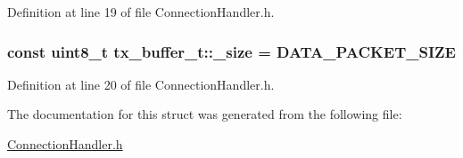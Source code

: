 \-Definition at line 19 of file \-Connection\-Handler.\-h.

\hypertarget{structtx__buffer__t_a9e50e47b9d21ef81014e8325acc2bb3f}{
\subsubsection[{\-\_\-size}]{\setlength{\rightskip}{0pt plus 5cm}const uint8\-\_\-t {\bf tx\-\_\-buffer\-\_\-t\-::\-\_\-size} = {\bf \-D\-A\-T\-A\-\_\-\-P\-A\-C\-K\-E\-T\-\_\-\-S\-I\-Z\-E}}}\label{structtx__buffer__t_a9e50e47b9d21ef81014e8325acc2bb3f}


\-Definition at line 20 of file \-Connection\-Handler.\-h.



\-The documentation for this struct was generated from the following file\-:\begin{DoxyCompactItemize}
\item 
\hyperlink{_connection_handler_8h}{\-Connection\-Handler.\-h}\end{DoxyCompactItemize}
